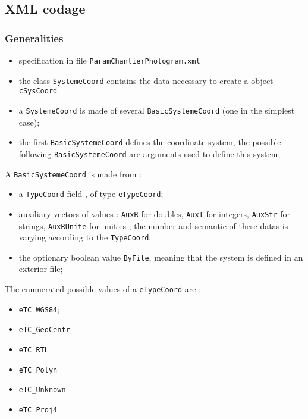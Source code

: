 
\subsection{XML codage}



\subsubsection{Generalities}

\begin{itemize}
   \item specification in file {\tt ParamChantierPhotogram.xml}
   \item the class {\tt SystemeCoord} contains the data necessary to create a \CPP object {\tt cSysCoord}
   \item  a {\tt SystemeCoord} is made of several {\tt BasicSystemeCoord} (one in the simplest case);

   \item the first  {\tt BasicSystemeCoord} defines the coordinate system, the possible following
          {\tt BasicSystemeCoord} are arguments used to define this system;
\end{itemize}

A  {\tt BasicSystemeCoord}  is made from :

\begin{itemize}
   \item  a {\tt TypeCoord}  field , of type {\tt eTypeCoord};
   \item auxiliary vectors of values : {\tt AuxR} for doubles, {\tt AuxI} for integers,
         {\tt AuxStr} for strings, {\tt AuxRUnite} for unities ; the  number and semantic of these datas is
         varying according  to  the  {\tt TypeCoord};

    \item the optionary boolean value {\tt ByFile}, meaning that the system is defined in an exterior file;

\end{itemize}

The enumerated possible values of a {\tt eTypeCoord} are :

\begin{itemize}
   \item  {\tt eTC\_WGS84};
   \item  {\tt eTC\_GeoCentr}
   \item  {\tt eTC\_RTL}
   \item  {\tt eTC\_Polyn}
   \item  {\tt eTC\_Unknown}
   \item  {\tt eTC\_Proj4}
\end{itemize}

